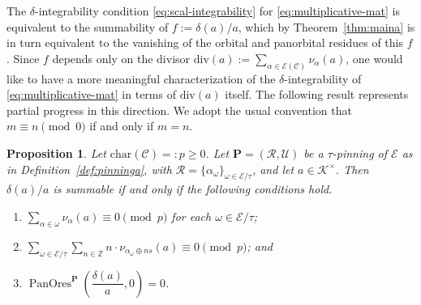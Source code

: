 \documentclass[preprint,12pt]{elsarticle}
\numberwithin{equation}{section} %
\theoremstyle{theorem}
\newtheorem{proposition}[theorem]{Proposition}
\theoremstyle{definition}
\newcommand{\Ca}{\mathcal{C}} %
\newcommand{\bk}{\mathcal{K}} %
\newcommand{\ec}{\mathcal{E}} %
\newcommand{\orbita}{{\ec/\tau}} %
\newcommand{\Z}{\mathbb{Z}} %
\DeclareMathOperator{\pano}{PanOres}
\begin{document}
The $\delta$-integrability condition \eqref{eq:scal-integrability} for \eqref{eq:multiplicative-mat} is equivalent to the summability of $f:=\delta(a)/a$, which by Theorem~\ref{thm:maina} is in turn equivalent to the vanishing of the orbital and panorbital residues of this $f$. Since $f$ depends only on the divisor $\mathrm{div}(a):=\sum_{\alpha\in\ec(\Ca)}\nu_\alpha(a)$, one would like to have a more meaningful characterization of the $\delta$-integrability of \eqref{eq:multiplicative-mat} in terms of $\mathrm{div}(a)$ itself. The following result represents partial progress in this direction. We adopt the usual convention that $m\equiv n\pmod{0}$ if and only if $m=n$. 

\begin{proposition}\label{prop:dlog-integrability} Let $\mathrm{char}(\Ca)=:p\geq 0$. Let $\mathbf{P}=(\mathcal{R},\mathcal{U})$ be a $\tau$-pinning of $\ec$ as in Definition~\ref{def:pinninga}, with $\mathcal{R}=\{\alpha_\omega\}_{\omega\in\orbita}$, and let $a\in\bk^\times$. Then $\delta(a)/a$ is summable if and only if the following conditions hold.
    \begin{enumerate}
        \item $\displaystyle \sum_{\alpha\in\omega}\nu_\alpha(a)\equiv 0\pmod{p}$ for each $\omega\in\orbita$;
        \item $\displaystyle \sum_{\omega\in\orbita}\sum_{n\in\Z}n\cdot\nu_{\alpha_\omega\oplus ns}(a)\equiv 0\pmod{p}$; and
        \item $\pano^\mathbf{P}\left(\dfrac{\delta(a)}{a},0\right)=0$.
    \end{enumerate}
\end{proposition}
\end{document}
